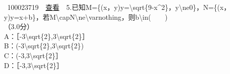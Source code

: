 ~{{100023719}~~\href{../question/viewQuestionDetail.jsp?questionID=100023719\&testPaperId=100229072}{查看}~~5.已知M=\{(x，y)\textbar{}y={\textbackslash{}sqrt\{9-x\^{}2\}}，y{\textbackslash{}ne}0{\}}，N=\{(x，y)\textbar{}y=x+b\}，若M{\textbackslash{}cap}N{\textbackslash{}ne}{\textbackslash{}varnothing}，则b{\textbackslash{}in}(　　)\\
\hspace*{0.333em}\hspace*{0.333em}（3.0分）\\
\hspace*{0.333em}\hspace*{0.333em}\hspace*{0.333em}\hspace*{0.333em}\hspace*{0.333em}\hspace*{0.333em}\hspace*{0.333em}\hspace*{0.333em}A：［-3{\textbackslash{}sqrt\{2\}},3{\textbackslash{}sqrt\{2\}}］\\
\hspace*{0.333em}\hspace*{0.333em}\hspace*{0.333em}\hspace*{0.333em}\hspace*{0.333em}\hspace*{0.333em}\hspace*{0.333em}\hspace*{0.333em}B：(-3{\textbackslash{}sqrt\{2\}},3{\textbackslash{}sqrt\{2\}})\\[2\baselineskip]\hspace*{0.333em}\hspace*{0.333em}\hspace*{0.333em}\hspace*{0.333em}\hspace*{0.333em}\hspace*{0.333em}\hspace*{0.333em}\hspace*{0.333em}C：(-3,3{\textbackslash{}sqrt\{2\}}］\\
\hspace*{0.333em}\hspace*{0.333em}\hspace*{0.333em}\hspace*{0.333em}\hspace*{0.333em}\hspace*{0.333em}\hspace*{0.333em}\hspace*{0.333em}D：［-3,3{\textbackslash{}sqrt\{2\}}］\\
}

